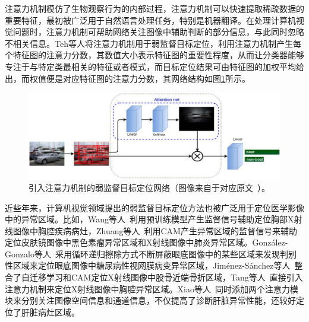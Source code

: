 注意力机制模仿了生物观察行为的内部过程，注意力机制可以快速提取稀疏数据的重要特征，最初被广泛用于自然语言处理任务，特别是机器翻译。在处理计算机视觉问题时，注意力机制可帮助网络关注图像中辅助判断的部分信息，与此同时忽略不相关信息。Teh等人\cite{BMVC2016_52}将注意力机制用于弱监督目标定位，利用注意力机制产生每个特征图的注意力分数，其数值大小表示特征图的重要性程度，从而让分类器能够专注于与特定类最相关的特征或者模式，而目标定位结果可由特征图的加权平均给出，而权值便是对应特征图的注意力分数，其网络结构如图\ref{fig:attention_weakly_supervised_object_localization}所示。
\begin{figure}[h]
	\centering
	\includegraphics[width=1.0\textwidth]{figure/attention_weakly_supervised_object_localization}
	\caption[引入注意力机制的弱监督目标定位网络]{引入注意力机制的弱监督目标定位网络（图像来自于对应原文~\cite{BMVC2016_52}）。}
	\label{fig:attention_weakly_supervised_object_localization}
\end{figure}

近些年来，计算机视觉领域提出的弱监督目标定位方法也被广泛用于定位医学影像中的异常区域。比如，Wang等人~\cite{WangPLLBS17}利用预训练模型产生监督信号辅助定位胸部X射线图像中胸腔疾病病灶，Zhuang等人~\cite{zhuang2019care}利用CAM产生异常区域的监督信号来辅助定位皮肤镜图像中黑色素瘤异常区域和X射线图像中肺炎异常区域。Gonz{\'a}lez-Gonzalo等人~\cite{GonzlezGonzalo2018ImprovingWL}采用循环递归擦除方式不断屏蔽眼底图像中的某些区域来发现判别性区域来定位眼底图像中糖尿病性视网膜病变异常区域，Jim{\'e}nez-S{\'a}nchez等人~\cite{JimnezSnchez2018WeaklySupervisedLA}整合了自迁移学习和CAM定位X射线图像中股骨近端骨折区域，Tang等人~\cite{Tang2018AttentionGuidedCL}直接引入注意力机制来定位X射线图像中胸腔异常区域。Xiao等人~\cite{chen2019cascade}同时添加两个注意力模块来分别关注图像空间信息和通道信息，不仅提高了诊断肝脏异常性能，还较好定位了肝脏病灶区域。

